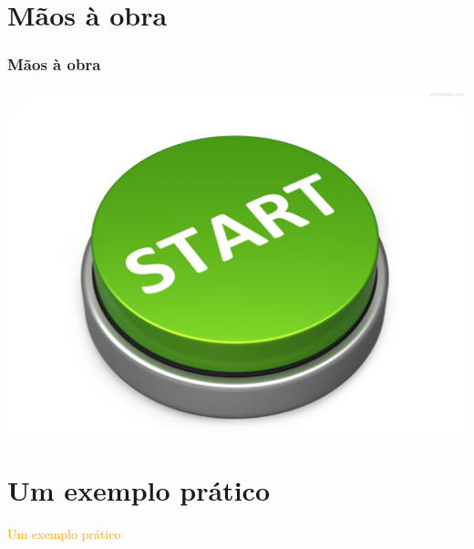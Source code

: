 \documentclass[aspectratio=169]{beamer} %
\begin{document}
\section{Mãos à obra}

\begin{frame}
    \frametitle{Mãos à obra}
	\centering
    \href{https://playground.tensorflow.org/}{\includegraphics[scale=0.25]{images/botao.png}} 

\end{frame}




\section{Um exemplo prático}
{
\begin{frame}
\vspace{2cm}
\begin{center}
\huge
	\textcolor{orange}{Um exemplo prático}
\end{center}

\end{frame}
}
\end{document}
